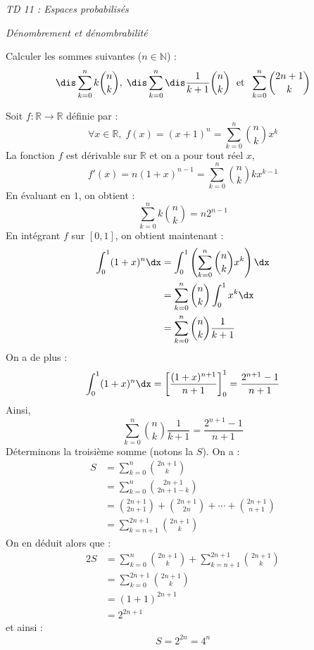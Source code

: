 \documentclass[a4paper,10pt]{report}
\begin{document}
\everymath{\displaystyle}
\begin{center}
\textit{{ {\huge TD 11 : Espaces probabilisés}}}
\end{center}

\bigskip


\begin{center}
\textit{{ {\large Dénombrement et dénombrabilité}}}
\end{center}

\medskip

\begin{Exercice}{} Calculer les sommes suivantes ($n \in \mathbb{N}$) : 
$$\dis\sum_{k=0}^n k \binom{n}{k}, \; \dis\sum_{k=0}^n\dis\frac{1}{k+1} \binom{n}{k} \; \hbox{ et } \; \sum_{k=0}^n \binom{2n+1}{k}$$
\end{Exercice}

\corr Soit $f : \mathbb{R} \rightarrow \mathbb{R}$ définie par :
$$ \forall x \in \mathbb{R}, \; f(x)=(x+1)^n = \sum_{k=0}^n \binom{n}{k} x^k$$
La fonction $f$ est dérivable sur $\mathbb{R}$ et on a pour tout réel $x$,
$$ f'(x) = n(1+x)^{n-1}=  \sum_{k=0}^n \binom{n}{k} k x^{k-1} $$
En évaluant en $1$, on obtient :
$$ \sum_{k=0}^n k \binom{n}{k}  = n2^{n-1}$$
En intégrant $f$ sur $[0,1]$, on obtient maintenant :
\begin{align*}
\int_0^1 (1+x)^n \dx & = \int_0^1 \left( \sum_{k=0}^n \binom{n}{k} x^k \right) \dx \\
& = \sum_{k=0}^n \binom{n}{k} \int_0^1 x^k \dx \\
& = \sum_{k=0}^n \binom{n}{k} \dfrac{1}{k+1}
\end{align*}
On a de plus :
$$ \int_0^1 (1+x)^n \dx  = \left[ \dfrac{(1+x)^{n+1}}{n+1} \right]_0^1 = \dfrac{2^{n+1}-1}{n+1}$$
Ainsi,
$$ \sum_{k=0}^n \binom{n}{k} \dfrac{1}{k+1} = \dfrac{2^{n+1}-1}{n+1}$$
Déterminons la troisième somme (notons la $S$). On a :
\begin{align*}
S & = \sum_{k=0}^{n} \binom{2n+1}{k} \\
& = \sum_{k=0}^{n} \binom{2n+1}{2n+1-k} \\
& = \binom{2n+1}{2n+1} + \binom{2n+1}{2n} + \cdots + \binom{2n+1}{n+1} \\
& = \sum_{k=n+1}^{2n+1} \binom{2n+1}{k}
\end{align*}
On en déduit alors que :
\begin{align*}
2S &  = \sum_{k=0}^{n} \binom{2n+1}{k} + \sum_{k=n+1}^{2n+1} \binom{2n+1}{k} \\
& = \sum_{k=0}^{2n+1} \binom{2n+1}{k} \\
& = (1+1)^{2n+1} \\
& = 2^{2n+1} 
\end{align*}
et ainsi :
$$  S= 2^{2n} = 4^n $$
\end{document}
